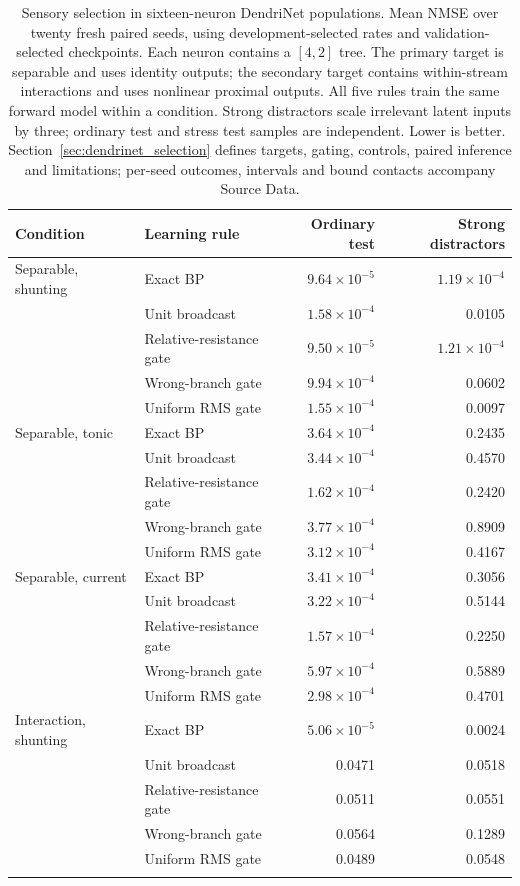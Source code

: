 \begin{table}[!htbp]
\centering
\caption{Sensory selection in sixteen-neuron DendriNet populations.
Mean NMSE over twenty fresh paired seeds, using development-selected rates and
validation-selected checkpoints. Each neuron contains a $[4,2]$ tree. The
primary target is separable and uses identity outputs; the secondary target
contains within-stream interactions and uses nonlinear proximal outputs.
All five rules train the same forward model within a condition. Strong
distractors scale irrelevant latent inputs by three; ordinary test and stress
test samples are independent. Lower is better. Section~\ref{sec:dendrinet_selection}
defines targets, gating, controls, paired inference and limitations; per-seed
outcomes, intervals and bound contacts accompany Source Data.}
\label{tab:dendrinet_selection}
\small
\begin{tabular}{llrr}
\toprule
Condition & Learning rule & Ordinary test & Strong distractors \\
\midrule
Separable, shunting & Exact BP & $9.64\times10^{-5}$ & $1.19\times10^{-4}$ \\
 & Unit broadcast & $1.58\times10^{-4}$ & 0.0105 \\
 & Relative-resistance gate & $9.50\times10^{-5}$ & $1.21\times10^{-4}$ \\
 & Wrong-branch gate & $9.94\times10^{-4}$ & 0.0602 \\
 & Uniform RMS gate & $1.55\times10^{-4}$ & 0.0097 \\
\addlinespace
Separable, tonic & Exact BP & $3.64\times10^{-4}$ & 0.2435 \\
 & Unit broadcast & $3.44\times10^{-4}$ & 0.4570 \\
 & Relative-resistance gate & $1.62\times10^{-4}$ & 0.2420 \\
 & Wrong-branch gate & $3.77\times10^{-4}$ & 0.8909 \\
 & Uniform RMS gate & $3.12\times10^{-4}$ & 0.4167 \\
\addlinespace
Separable, current & Exact BP & $3.41\times10^{-4}$ & 0.3056 \\
 & Unit broadcast & $3.22\times10^{-4}$ & 0.5144 \\
 & Relative-resistance gate & $1.57\times10^{-4}$ & 0.2250 \\
 & Wrong-branch gate & $5.97\times10^{-4}$ & 0.5889 \\
 & Uniform RMS gate & $2.98\times10^{-4}$ & 0.4701 \\
\addlinespace
Interaction, shunting & Exact BP & $5.06\times10^{-5}$ & 0.0024 \\
 & Unit broadcast & 0.0471 & 0.0518 \\
 & Relative-resistance gate & 0.0511 & 0.0551 \\
 & Wrong-branch gate & 0.0564 & 0.1289 \\
 & Uniform RMS gate & 0.0489 & 0.0548 \\
\addlinespace
\bottomrule
\end{tabular}
\end{table}

